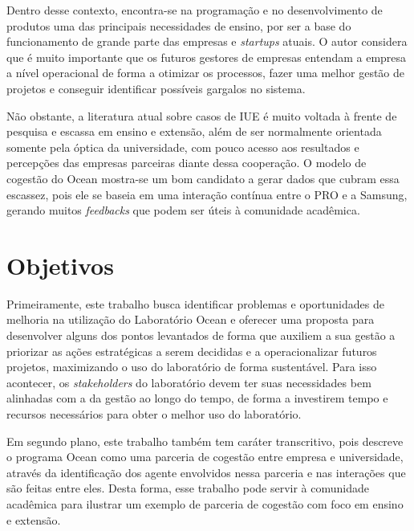 Dentro desse contexto, encontra-se na programação e no desenvolvimento de produtos uma das principais necessidades de ensino, por ser a base do funcionamento de grande parte das empresas e \textit{startups} atuais. O autor considera que é muito importante que os futuros gestores de empresas entendam a empresa a nível operacional de forma a otimizar os processos, fazer uma melhor gestão de projetos e conseguir identificar possíveis gargalos no sistema.

Não obstante, a literatura atual sobre casos de IUE é muito voltada à frente de pesquisa e escassa em ensino e extensão, além de ser normalmente orientada somente pela óptica da universidade, com pouco acesso aos resultados e percepções das empresas parceiras diante dessa cooperação. O modelo de cogestão do Ocean mostra-se um bom candidato a gerar dados que cubram essa escassez, pois ele se baseia em uma interação contínua entre o PRO e a Samsung, gerando muitos \textit{feedbacks} que podem ser úteis à comunidade acadêmica. 

\section[Objetivos]{Objetivos}
\label{chap:objetivos}

Primeiramente, este trabalho busca identificar problemas e oportunidades de melhoria na utilização do Laboratório Ocean e oferecer uma proposta para desenvolver alguns dos pontos levantados de forma que auxiliem a sua gestão a priorizar as ações estratégicas a serem decididas e a operacionalizar futuros projetos, maximizando o uso do laboratório de forma sustentável. Para isso acontecer, os \textit{stakeholders} do laboratório devem ter suas necessidades bem alinhadas com a da gestão ao longo do tempo, de forma a investirem tempo e recursos necessários para obter o melhor uso do laboratório.

Em segundo plano, este trabalho também tem caráter transcritivo, pois descreve o programa Ocean como uma parceria de cogestão entre empresa e universidade, através da identificação dos agente envolvidos nessa parceria e nas interações que são feitas entre eles. Desta forma, esse trabalho pode servir à comunidade acadêmica para ilustrar um exemplo de parceria de cogestão com foco em ensino e extensão.